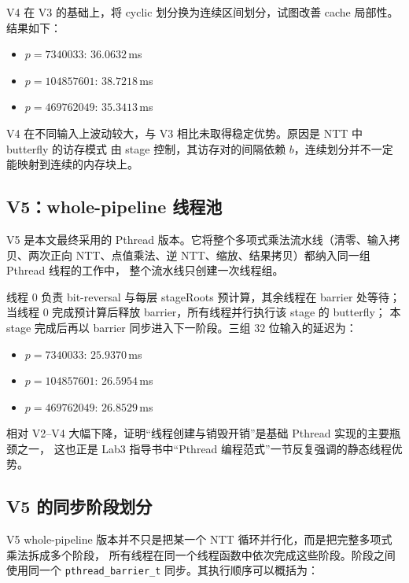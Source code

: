 \documentclass[UTF8,a4paper,10pt]{ctexart}
\begin{document}
V4 在 V3 的基础上，将 cyclic 划分换为连续区间划分，试图改善 cache 局部性。结果如下：

\begin{itemize}
  \item $p = 7340033$: $36.0632$\,ms
  \item $p = 104857601$: $38.7218$\,ms
  \item $p = 469762049$: $35.3413$\,ms
\end{itemize}

V4 在不同输入上波动较大，与 V3 相比未取得稳定优势。原因是 NTT 中 butterfly 的访存模式
由 stage 控制，其访存对的间隔依赖 $b$，连续划分并不一定能映射到连续的内存块上。

\subsection{V5：whole-pipeline 线程池}

V5 是本文最终采用的 Pthread 版本。它将整个多项式乘法流水线（清零、输入拷贝、两次正向
NTT、点值乘法、逆 NTT、缩放、结果拷贝）都纳入同一组 Pthread 线程的工作中，
整个流水线只创建一次线程组。

线程 0 负责 bit-reversal 与每层 stageRoots 预计算，其余线程在 barrier 处等待；
当线程 0 完成预计算后释放 barrier，所有线程并行执行该 stage 的 butterfly；
本 stage 完成后再以 barrier 同步进入下一阶段。三组 32 位输入的延迟为：

\begin{itemize}
  \item $p = 7340033$: $25.9370$\,ms
  \item $p = 104857601$: $26.5954$\,ms
  \item $p = 469762049$: $26.8529$\,ms
\end{itemize}

相对 V2--V4 大幅下降，证明``线程创建与销毁开销''是基础 Pthread 实现的主要瓶颈之一，
这也正是 Lab3 指导书中``Pthread 编程范式''一节反复强调的静态线程优势\cite{butenhof1997programming}。


\subsection{V5 的同步阶段划分}

V5 whole-pipeline 版本并不只是把某一个 NTT 循环并行化，而是把完整多项式乘法拆成多个阶段，
所有线程在同一个线程函数中依次完成这些阶段。阶段之间使用同一个 \texttt{pthread\_barrier\_t}
同步。其执行顺序可以概括为：
\end{document}
